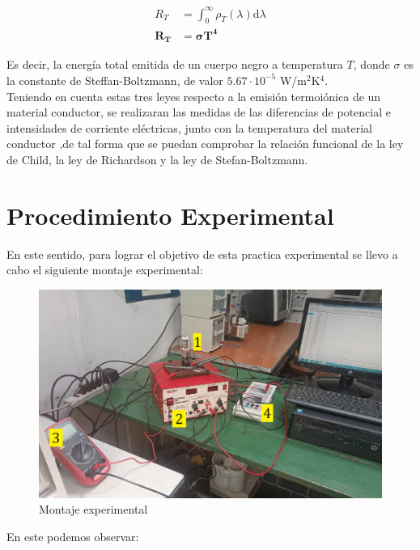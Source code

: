 \documentclass[%
 reprint,
 amsmath,amssymb,
 aps,
]{revtex4-2}
\begin{document}
\begin{align}
    \nonumber
    R_T &= \int_{0}^{\infty} \rho_{T}(\lambda) \mathrm{d}\lambda\\
    \boldsymbol{R_T} &\boldsymbol{= \sigma T^4}
    \label{eq: Ley de Stefan}
\end{align}


\vspace{0.2 cm}
Es decir, la energía total emitida de un cuerpo negro a temperatura $T$, donde $\sigma$ es la constante de Steffan-Boltzmann, de valor $5.67\cdot 10^{-5}$ W/m$^{2}$K$^{4}$.
\\

Teniendo en cuenta estas tres leyes respecto a la emisión termoiónica de un material conductor, se realizaran las medidas de las diferencias de potencial e intensidades de corriente eléctricas, junto con la temperatura del material conductor ,de tal forma que se puedan comprobar la relación funcional de la ley de Child, la ley de Richardson y la ley de Stefan-Boltzmann.

\section{Procedimiento Experimental}
En este sentido, para lograr el objetivo de esta practica experimental se llevo a cabo el siguiente montaje experimental:

\begin{figure}[H]
    \centering
    \includegraphics[width=0.9\linewidth]{imagenes/MontajeEFM2nada.jpg}
    \caption{Montaje experimental}
    \label{montajel}
\end{figure}

En este podemos observar:
\end{document}
